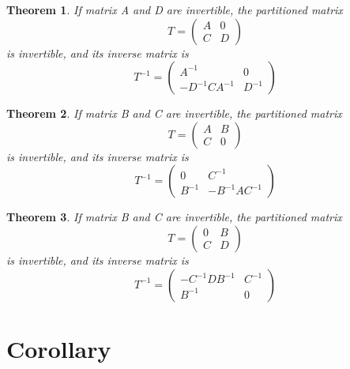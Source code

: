 \documentclass{article}
\newtheorem{theorem}{Theorem}
\begin{document}
    \begin{theorem}
        If matrix A and D are invertible, the partitioned matrix
        $$
            T = 
            \begin{pmatrix}
                A & 0 \\
                C & D
            \end{pmatrix}
        $$
        is invertible, and its inverse matrix is
        $$
            T^{-1} = 
            \begin{pmatrix}
                A^{-1} & 0 \\
                -D^{-1} C A^{-1} & D^{-1}
            \end{pmatrix}
        $$
    \end{theorem}
    
    \begin{theorem}
        If matrix B and C are invertible, the partitioned matrix
        $$
            T = 
            \begin{pmatrix}
                A & B \\
                C & 0
            \end{pmatrix}
        $$
        is invertible, and its inverse matrix is
        $$
            T^{-1} = 
            \begin{pmatrix}
                0 & C^{-1} \\
                B^{-1} & -B^{-1} A C^{-1}
            \end{pmatrix}
        $$
    \end{theorem}
    
    \begin{theorem}
        If matrix B and C are invertible, the partitioned matrix
        $$
            T = 
            \begin{pmatrix}
                0 & B \\
                C & D
            \end{pmatrix}
        $$
        is invertible, and its inverse matrix is
        $$
            T^{-1} = 
            \begin{pmatrix}
                -C^{-1} D B^{-1} & C^{-1} \\
                B^{-1}  & 0
            \end{pmatrix}
        $$
    \end{theorem}
    
\section{Corollary}
\end{document}
